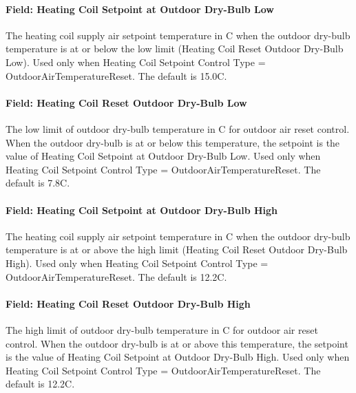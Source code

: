 \paragraph{Field: Heating Coil Setpoint at Outdoor Dry-Bulb Low}\label{field-heating-coil-setpoint-at-outdoor-dry-bulb-low}

The heating coil supply air setpoint temperature in C when the outdoor dry-bulb temperature is at or below the low limit (Heating Coil Reset Outdoor Dry-Bulb Low). Used only when Heating Coil Setpoint Control Type = OutdoorAirTemperatureReset. The default is 15.0C.

\paragraph{Field: Heating Coil Reset Outdoor Dry-Bulb Low}\label{field-heating-coil-reset-outdoor-dry-bulb-low}

The low limit of outdoor dry-bulb temperature in C for outdoor air reset control. When the outdoor dry-bulb is at or below this temperature, the setpoint is the value of Heating Coil Setpoint at Outdoor Dry-Bulb Low. Used only when Heating Coil Setpoint Control Type = OutdoorAirTemperatureReset. The default is 7.8C.

\paragraph{Field: Heating Coil Setpoint at Outdoor Dry-Bulb High}\label{field-heating-coil-setpoint-at-outdoor-dry-bulb-high}

The heating coil supply air setpoint temperature in C when the outdoor dry-bulb temperature is at or above the high limit (Heating Coil Reset Outdoor Dry-Bulb High). Used only when Heating Coil Setpoint Control Type = OutdoorAirTemperatureReset. The default is 12.2C.

\paragraph{Field: Heating Coil Reset Outdoor Dry-Bulb High}\label{field-heating-coil-reset-outdoor-dry-bulb-high}

The high limit of outdoor dry-bulb temperature in C for outdoor air reset control. When the outdoor dry-bulb is at or above this temperature, the setpoint is the value of Heating Coil Setpoint at Outdoor Dry-Bulb High. Used only when Heating Coil Setpoint Control Type = OutdoorAirTemperatureReset. The default is 12.2C.

